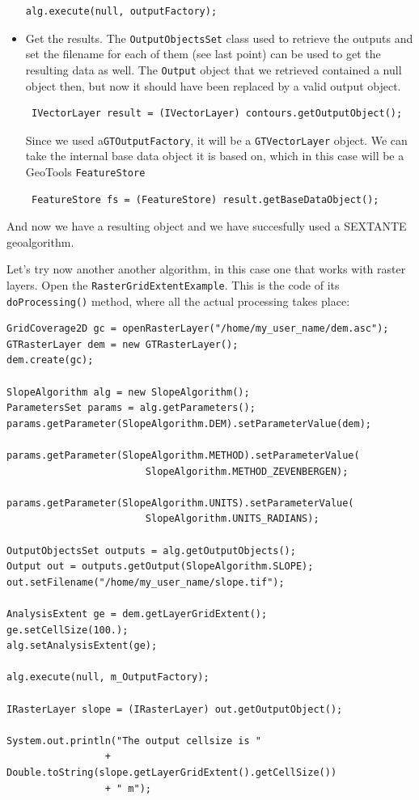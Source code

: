 \begin{itemize}
\begin{verbatim}
alg.execute(null, outputFactory);
\end{verbatim}

\item Get the results. The \texttt{OutputObjectsSet} class used to retrieve the outputs and set the filename for each of them (see last point) can be used to get the resulting data as well. The \texttt{Output} object that we retrieved contained a null object then, but now it should have been replaced by a valid output object.

\begin{verbatim}
 IVectorLayer result = (IVectorLayer) contours.getOutputObject();
\end{verbatim}

Since we used a\texttt{GTOutputFactory}, it will be a \texttt{GTVectorLayer} object. We can take the internal base data object it is based on, which in this case will be a GeoTools \texttt{FeatureStore}

\begin{verbatim}
 FeatureStore fs = (FeatureStore) result.getBaseDataObject();
\end{verbatim}

\end{itemize}

And now we have a resulting object and we have succesfully used a SEXTANTE geoalgorithm.

Let's try now another another algorithm, in this case one that works with raster layers. Open the \texttt{RasterGridExtentExample}. This is the code of its \texttt{doProcessing()} method, where all the actual processing takes place:

\begin{verbatim}
GridCoverage2D gc = openRasterLayer("/home/my_user_name/dem.asc");
GTRasterLayer dem = new GTRasterLayer();
dem.create(gc);

SlopeAlgorithm alg = new SlopeAlgorithm();
ParametersSet params = alg.getParameters();
params.getParameter(SlopeAlgorithm.DEM).setParameterValue(dem);

params.getParameter(SlopeAlgorithm.METHOD).setParameterValue(
                        SlopeAlgorithm.METHOD_ZEVENBERGEN);

params.getParameter(SlopeAlgorithm.UNITS).setParameterValue(
                        SlopeAlgorithm.UNITS_RADIANS);

OutputObjectsSet outputs = alg.getOutputObjects();
Output out = outputs.getOutput(SlopeAlgorithm.SLOPE);
out.setFilename("/home/my_user_name/slope.tif");

AnalysisExtent ge = dem.getLayerGridExtent();
ge.setCellSize(100.);
alg.setAnalysisExtent(ge);

alg.execute(null, m_OutputFactory);

IRasterLayer slope = (IRasterLayer) out.getOutputObject();

System.out.println("The output cellsize is "
                 + Double.toString(slope.getLayerGridExtent().getCellSize())
                 + " m");
\end{verbatim}

